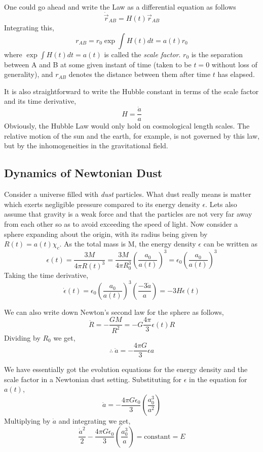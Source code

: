 \documentclass[a4paper,11pt]{article}
\begin{document}
One could go ahead and write the Law as a differential equation as follows
$$\dot{\vec{r}}_{AB}=H(t)\vec{r}_{AB}$$ Integrating this,
$$ r_{AB} = r_0 \exp\int H(t)dt = a(t)  r_0 $$
where $\exp\int H(t)dt = a(t)$ is called the \textit{scale factor}. $r_0$ is the separation between A and B at some given instant of time (taken to be $t=0$ without loss of generality), and $r_{AB}$ denotes the distance between them after time $t$ has elapsed.

It is also straightforward to write the Hubble constant in terms of the scale factor and its time derivative,
$$H =\frac{\dot{a}}{a}$$
Obviously, the Hubble Law would only hold on cosmological length scales. The relative motion of the sun and the earth, for example, is not governed by this law, but by the inhomogeneities in the gravitational field.

\subsection{Dynamics of Newtonian Dust}
Consider a universe filled with \textit{dust} particles. What dust really means is matter which exerts negligible pressure compared to its energy density $\epsilon$. Lets also assume that gravity is a weak force and that the particles are not very far away from each other so as to avoid exceeding the speed of light. Now consider a sphere expanding about the origin, with its radius being given by $R(t) = a(t) \chi_{c}$. As the total mass is M, the energy density $\epsilon$ can be written as
$$\epsilon(t)= \frac{3M}{4 \pi R(t)^3} = \frac{3M}{4 \pi R_0^3} \left(\frac{a_0}{a(t)}\right)^3 = \epsilon_0 \left(\frac{a_0}{a(t)}\right)^3  $$
Taking the time derivative,
$$\dot{\epsilon}(t) = \epsilon_0 \left(\frac{a_0}{a(t)}\right)^3 \left(\frac{-3\dot{a}}{a}\right) = -3H \epsilon(t)$$

We can also write down Newton's second law for the sphere as follows,
$$\ddot{R} = -\frac{GM}{R^2} = -G \frac{4 \pi }{3} \epsilon(t) R $$
Dividing by $R_0$ we get,
$$\therefore  \ \ddot{a} = -  \frac{4 \pi G}{3} \epsilon a$$

We have essentially got the evolution equations for the energy density and the scale factor in a Newtonian dust setting. Substituting for $\epsilon$ in the equation for $a(t)$,
$$\ddot{a} = -  \frac{4 \pi G \epsilon_0}{3}  \left(\frac{a_0^3}{a^2}\right) $$
Multiplying by $\dot{a}$ and integrating we get,
$$\frac{\dot{a}^2}{2} - \frac{4 \pi G \epsilon_0}{3}  \left(\frac{a_0^3}{a}\right) = \text{constant} = E  $$
\end{document}
